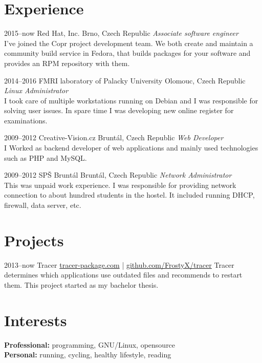 \documentclass[]{friggeri-cv}
\begin{document}
\section{Experience}
\begin{entrylist}

\entry
{2015--now}
{Red Hat, Inc.}
{Brno, Czech Republic}
{\emph{Associate software engineer} \\
I've joined the Copr project development team. We both create and maintain a community build service in Fedora, that builds packages for your software and provides an RPM repository with them.}

\entry
{2014--2016}
{FMRI laboratory of Palacky University}
{Olomouc, Czech Republic}
{\emph{Linux Administrator} \\
I took care of multiple workstations running on Debian and I was responsible for solving user issues. In spare time I was developing new online register for examinations.}

\entry
{2009--2012}
{Creative-Vision.cz}
{Bruntál, Czech Republic}
{\emph{Web Developer} \\
I Worked as backend developer of web applications and mainly used technologies such as PHP and MySQL.}

\entry
{2009--2012}
{SPŠ Bruntál}
{Bruntál, Czech Republic}
{\emph{Network Administrator} \\
This was unpaid work experience. I was responsible for providing network connection to about hundred students in the hostel. It included running DHCP, firewall, data server, etc.}

\end{entrylist}


\section{Projects}

\begin{entrylist}

\entry
{2013--now}
{Tracer}
{\href{http://tracer-package.com}{tracer-package.com} | \href{https://github.com/FrostyX/tracer}{github.com/FrostyX/tracer}}
{Tracer determines which applications use outdated files and recommends to restart them. This project started as my bachelor thesis.}

\end{entrylist}



\section{Interests}

\textbf{Professional:} programming, GNU/Linux, opensource
\\
\textbf{Personal:} running, cycling, healthy lifestyle, reading
\end{document}
